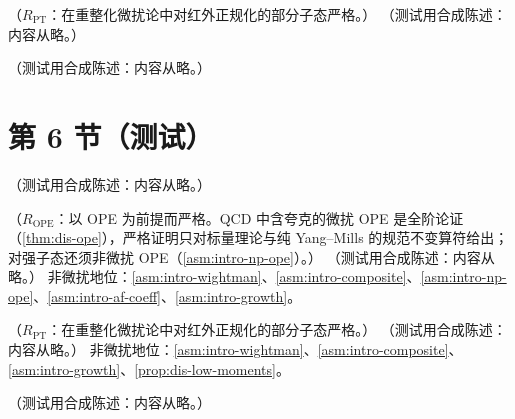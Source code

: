 \begin{proposition}\label{prop:pdf-local-anomalous}
（$R_{\mathrm{PT}}$：在重整化微扰论中对红外正规化的部分子态严格。）
（测试用合成陈述：内容从略。）
\end{proposition}

\begin{example}\label{ex:pdf-moments-exact}
（测试用合成陈述：内容从略。）
\end{example}

\section{第 6 节（测试）}\label{sec:pdf-oneloop}

\begin{example}[胶子中的夸克]\label{ex:pdf-quark-in-gluon}
（测试用合成陈述：内容从略。）
\end{example}

\begin{theorem}\label{thm:pdf-dis-xspace}
（$R_{\mathrm{OPE}}$：以 OPE 为前提而严格。QCD 中含夸克的微扰 OPE 是全阶论证（\cref{thm:dis-ope}），严格证明只对标量理论与纯 Yang--Mills 的规范不变算符给出；对强子态还须非微扰 OPE（\cref{asm:intro-np-ope}）。）
（测试用合成陈述：内容从略。）
非微扰地位：\cref{asm:intro-wightman}、\cref{asm:intro-composite}、\cref{asm:intro-np-ope}、\cref{asm:intro-af-coeff}、\cref{asm:intro-growth}。
\end{theorem}

\begin{proposition}\label{prop:pdf-sum-rules}
（$R_{\mathrm{PT}}$：在重整化微扰论中对红外正规化的部分子态严格。）
（测试用合成陈述：内容从略。）
非微扰地位：\cref{asm:intro-wightman}、\cref{asm:intro-composite}、\cref{asm:intro-growth}、\cref{prop:dis-low-moments}。
\end{proposition}

\begin{remark}[解析延拓与 $P^\pm_{\rm NS}$]\label{rem:pdf-ns-plusminus}
（测试用合成陈述：内容从略。）
\end{remark}

